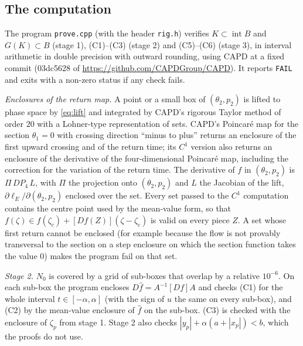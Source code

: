 \documentclass[11pt]{article}
\theoremstyle{definition}
\begin{document}
\subsection{The computation}\label{sec:computation}

The program \texttt{prove.cpp} (with the header \texttt{rig.h}) verifies $K \subset \operatorname{int}B$ and $G(K) \subset B$ (stage 1), (C1)--(C3) (stage 2) and (C5)--(C6) (stage 3), in interval arithmetic in double precision with outward rounding, using CAPD \cite{capd2021} at a fixed commit (03dc5628 of \url{https://github.com/CAPDGroup/CAPD}). It reports \texttt{FAIL} and exits with a non-zero status if any check fails.

\emph{Enclosures of the return map.} A point or a small box of $(\theta_2, p_2)$ is lifted to phase space by \eqref{eq:lift} and integrated by CAPD's rigorous Taylor method of order $20$ with a Lohner-type representation of sets. CAPD's Poincar\'e map for the section $\theta_1 = 0$ with crossing direction ``minus to plus'' returns an enclosure of the first upward crossing and of the return time; its $C^1$ version also returns an enclosure of the derivative of the four-dimensional Poincar\'e map, including the correction for the variation of the return time. The derivative of $f$ in $(\theta_2, p_2)$ is $\Pi\,DP_4\,L$, with $\Pi$ the projection onto $(\theta_2, p_2)$ and $L$ the Jacobian of the lift, $\partial\ell_E/\partial(\theta_2, p_2)$ enclosed over the set. Every set passed to the $C^1$ computation contains the centre point used by the mean-value form, so that $f(\zeta) \in f(\zeta_c) + [Df(Z)](\zeta - \zeta_c)$ is valid on every piece $Z$. A set whose first return cannot be enclosed (for example because the flow is not provably transversal to the section on a step enclosure on which the section function takes the value $0$) makes the program fail on that set.

\emph{Stage 2.} $N_0$ is covered by a grid of sub-boxes that overlap by a relative $10^{-6}$. On each sub-box the program encloses $D\hat f = A^{-1}[Df]A$ and checks (C1) for the whole interval $t \in [-\alpha, \alpha]$ (with the sign of $u$ the same on every sub-box), and (C2) by the mean-value enclosure of $\hat f$ on the sub-box. (C3) is checked with the enclosure of $\zeta_p$ from stage 1. Stage 2 also checks $|y_p| + \alpha(a + |x_p|) < b$, which the proofs do not use.
\end{document}
